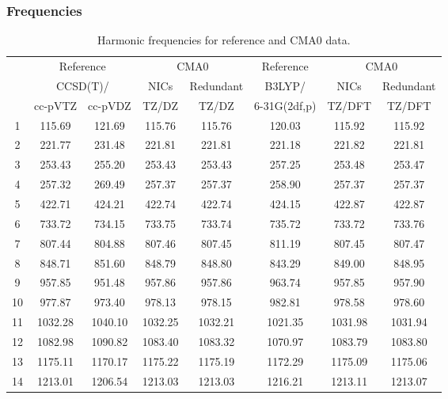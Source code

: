 \documentclass[10pt,oneside]{article}
\begin{document}
\begin{table}[h!]
\subsubsection*{Frequencies}
\centering
\caption{Harmonic frequencies for reference and CMA0 data.}
\begin{tabular}{cccccccc}
\toprule
{} & \multicolumn{2}{c}{Reference} & \multicolumn{2}{c}{CMA0} &    Reference & \multicolumn{2}{c}{CMA0} \\
{} & \multicolumn{2}{c}{CCSD(T)/} &    NICs &  Redundant &       B3LYP/ &    NICs & Redundant \\
{} &   cc-pVTZ & cc-pVDZ &   TZ/DZ &      TZ/DZ & 6-31G(2df,p) &  TZ/DFT &    TZ/DFT \\
\midrule
1  &    115.69 &  121.69 &  115.76 &     115.76 &       120.03 &  115.92 &    115.92 \\
2  &    221.77 &  231.48 &  221.81 &     221.81 &       221.18 &  221.82 &    221.81 \\
3  &    253.43 &  255.20 &  253.43 &     253.43 &       257.25 &  253.48 &    253.47 \\
4  &    257.32 &  269.49 &  257.37 &     257.37 &       258.90 &  257.37 &    257.37 \\
5  &    422.71 &  424.21 &  422.74 &     422.74 &       424.15 &  422.87 &    422.87 \\
6  &    733.72 &  734.15 &  733.75 &     733.74 &       735.72 &  733.72 &    733.76 \\
7  &    807.44 &  804.88 &  807.46 &     807.45 &       811.19 &  807.45 &    807.47 \\
8  &    848.71 &  851.60 &  848.79 &     848.80 &       843.29 &  849.00 &    848.95 \\
9  &    957.85 &  951.48 &  957.86 &     957.86 &       963.74 &  957.85 &    957.90 \\
10 &    977.87 &  973.40 &  978.13 &     978.15 &       982.81 &  978.58 &    978.60 \\
11 &   1032.28 & 1040.10 & 1032.25 &    1032.21 &      1021.35 & 1031.98 &   1031.94 \\
12 &   1082.98 & 1090.82 & 1083.40 &    1083.32 &      1070.97 & 1083.79 &   1083.80 \\
13 &   1175.11 & 1170.17 & 1175.22 &    1175.19 &      1172.29 & 1175.09 &   1175.06 \\
14 &   1213.01 & 1206.54 & 1213.03 &    1213.03 &      1216.21 & 1213.11 &   1213.07 \\

\end{tabular}
\end{table}
\end{document}
